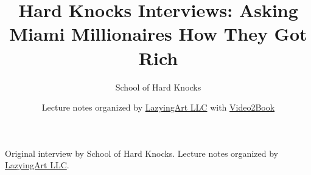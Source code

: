 \documentclass[11pt,oneside]{book}
\begin{document}
\frontmatter
\title{Hard Knocks Interviews: Asking Miami Millionaires How They Got Rich}
\author{School of Hard Knocks}
\date{Lecture notes organized by \href{https://lazying.art}{LazyingArt LLC} with \href{https://github.com/lachlanchen/Video2Book}{Video2Book}}
\maketitle
\begin{center}
\small Original interview by School of Hard Knocks. Lecture notes organized by \href{https://lazying.art}{LazyingArt LLC}.
\end{center}
\clearpage
\mainmatter

\end{document}
